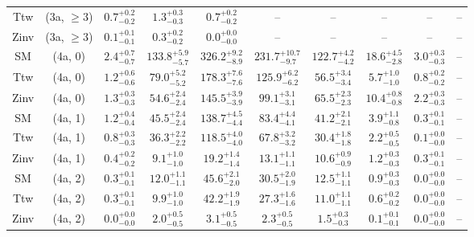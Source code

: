 \begin{table}[h!]
{\begin{tabular}{cccccccccc}
	Ttw & (3a, $\ge3$) & $0.7^{+ 0.2 }_{- 0.2 }$ & $1.3^{+ 0.3 }_{- 0.3 }$ & $0.7^{+ 0.2 }_{- 0.2 }$ & -- & -- & -- & -- & -- \\[0.5ex] 
	Zinv & (3a, $\ge3$) & $0.1^{+ 0.1 }_{- 0.1 }$ & $0.3^{+ 0.2 }_{- 0.2 }$ & $0.0^{+ 0.0 }_{- 0.0 }$ & -- & -- & -- & -- & -- \\[0.5ex] 
	SM & (4a, 0) & $2.4^{+ 0.7 }_{- 0.7 }$ & $133.8^{+ 5.9 }_{- 5.7 }$ & $326.2^{+ 9.2 }_{- 8.9 }$ & $231.7^{+ 10.7 }_{- 9.7 }$ & $122.7^{+ 4.2 }_{- 4.2 }$ & $18.6^{+ 4.5 }_{- 2.8 }$ & $3.0^{+ 0.3 }_{- 0.3 }$ & -- \\[0.5ex] 
	Ttw & (4a, 0) & $1.2^{+ 0.6 }_{- 0.6 }$ & $79.0^{+ 5.2 }_{- 5.2 }$ & $178.3^{+ 7.6 }_{- 7.6 }$ & $125.9^{+ 6.2 }_{- 6.2 }$ & $56.5^{+ 3.4 }_{- 3.4 }$ & $5.7^{+ 1.0 }_{- 1.0 }$ & $0.8^{+ 0.2 }_{- 0.2 }$ & -- \\[0.5ex] 
	Zinv & (4a, 0) & $1.3^{+ 0.3 }_{- 0.3 }$ & $54.6^{+ 2.4 }_{- 2.4 }$ & $145.5^{+ 3.9 }_{- 3.9 }$ & $99.1^{+ 3.1 }_{- 3.1 }$ & $65.5^{+ 2.3 }_{- 2.3 }$ & $10.4^{+ 0.8 }_{- 0.8 }$ & $2.2^{+ 0.3 }_{- 0.3 }$ & -- \\[0.5ex] 
	SM & (4a, 1) & $1.2^{+ 0.4 }_{- 0.4 }$ & $45.5^{+ 2.4 }_{- 2.4 }$ & $138.7^{+ 4.5 }_{- 4.4 }$ & $83.4^{+ 4.4 }_{- 4.1 }$ & $41.2^{+ 2.1 }_{- 2.1 }$ & $3.9^{+ 1.1 }_{- 0.8 }$ & $0.3^{+ 0.1 }_{- 0.1 }$ & -- \\[0.5ex] 
	Ttw & (4a, 1) & $0.8^{+ 0.3 }_{- 0.3 }$ & $36.3^{+ 2.2 }_{- 2.2 }$ & $118.5^{+ 4.0 }_{- 4.0 }$ & $67.8^{+ 3.2 }_{- 3.2 }$ & $30.4^{+ 1.8 }_{- 1.8 }$ & $2.2^{+ 0.5 }_{- 0.5 }$ & $0.1^{+ 0.0 }_{- 0.0 }$ & -- \\[0.5ex] 
	Zinv & (4a, 1) & $0.4^{+ 0.2 }_{- 0.2 }$ & $9.1^{+ 1.0 }_{- 1.0 }$ & $19.2^{+ 1.4 }_{- 1.4 }$ & $13.1^{+ 1.1 }_{- 1.1 }$ & $10.6^{+ 0.9 }_{- 0.9 }$ & $1.2^{+ 0.3 }_{- 0.3 }$ & $0.3^{+ 0.1 }_{- 0.1 }$ & -- \\[0.5ex] 
	SM & (4a, 2) & $0.3^{+ 0.1 }_{- 0.1 }$ & $12.0^{+ 1.1 }_{- 1.1 }$ & $45.6^{+ 2.1 }_{- 2.0 }$ & $30.5^{+ 2.0 }_{- 1.9 }$ & $12.5^{+ 1.1 }_{- 1.1 }$ & $0.9^{+ 0.3 }_{- 0.3 }$ & $0.0^{+ 0.0 }_{- 0.0 }$ & -- \\[0.5ex] 
	Ttw & (4a, 2) & $0.3^{+ 0.1 }_{- 0.1 }$ & $9.9^{+ 1.0 }_{- 1.0 }$ & $42.2^{+ 1.9 }_{- 1.9 }$ & $27.3^{+ 1.6 }_{- 1.6 }$ & $11.0^{+ 1.1 }_{- 1.1 }$ & $0.6^{+ 0.2 }_{- 0.2 }$ & $0.0^{+ 0.0 }_{- 0.0 }$ & -- \\[0.5ex] 
	Zinv & (4a, 2) & $0.0^{+ 0.0 }_{- 0.0 }$ & $2.0^{+ 0.5 }_{- 0.5 }$ & $3.1^{+ 0.5 }_{- 0.5 }$ & $2.3^{+ 0.5 }_{- 0.5 }$ & $1.5^{+ 0.3 }_{- 0.3 }$ & $0.1^{+ 0.1 }_{- 0.1 }$ & $0.0^{+ 0.0 }_{- 0.0 }$ & -- \\[0.5ex] 

\end{tabular}}
\end{table}
